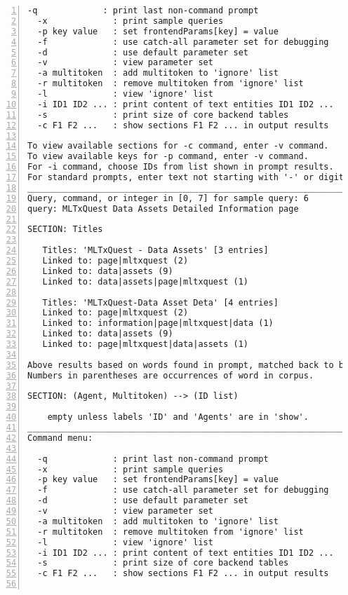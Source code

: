 \documentclass[10pt]{article}
\begin{document}
{\begin{lstlisting}[numbers=left,basicstyle=\ttfamily\footnotesize, frame=none]
  -q             : print last non-command prompt
  -x             : print sample queries
  -p key value   : set frontendParams[key] = value
  -f             : use catch-all parameter set for debugging
  -d             : use default parameter set
  -v             : view parameter set
  -a multitoken  : add multitoken to 'ignore' list
  -r multitoken  : remove multitoken from 'ignore' list
  -l             : view 'ignore' list
  -i ID1 ID2 ... : print content of text entities ID1 ID2 ...
  -s             : print size of core backend tables
  -c F1 F2 ...   : show sections F1 F2 ... in output results

To view available sections for -c command, enter -v command.
To view available keys for -p command, enter -v command.
For -i command, choose IDs from list shown in prompt results.
For standard prompts, enter text not starting with '-' or digit.
____________________________________________________________________
Query, command, or integer in [0, 7] for sample query: 6
query: MLTxQuest Data Assets Detailed Information page

SECTION: Titles

   Titles: 'MLTxQuest - Data Assets' [3 entries]
   Linked to: page|mltxquest (2)
   Linked to: data|assets (9)
   Linked to: data|assets|page|mltxquest (1)

   Titles: 'MLTxQuest-Data Asset Deta' [4 entries]
   Linked to: page|mltxquest (2)
   Linked to: information|page|mltxquest|data (1)
   Linked to: data|assets (9)
   Linked to: page|mltxquest|data|assets (1)

Above results based on words found in prompt, matched back to backend tables.
Numbers in parentheses are occurrences of word in corpus.

SECTION: (Agent, Multitoken) --> (ID list)

    empty unless labels 'ID' and 'Agents' are in 'show'.
____________________________________________________________________
Command menu:

  -q             : print last non-command prompt
  -x             : print sample queries
  -p key value   : set frontendParams[key] = value
  -f             : use catch-all parameter set for debugging
  -d             : use default parameter set
  -v             : view parameter set
  -a multitoken  : add multitoken to 'ignore' list
  -r multitoken  : remove multitoken from 'ignore' list
  -l             : view 'ignore' list
  -i ID1 ID2 ... : print content of text entities ID1 ID2 ...
  -s             : print size of core backend tables
  -c F1 F2 ...   : show sections F1 F2 ... in output results


\end{lstlisting}}
\end{document}
